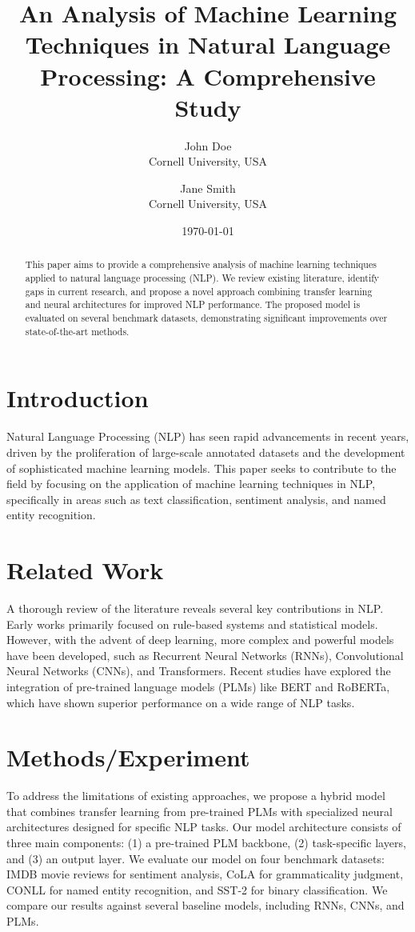 \documentclass{article}
\title{An Analysis of Machine Learning Techniques in Natural Language Processing: A Comprehensive Study}
\author{John Doe \\
        Cornell University, USA\\
        \and Jane Smith \\
        Cornell University, USA}
\date{\today}
\begin{document}
\maketitle

\begin{abstract}
This paper aims to provide a comprehensive analysis of machine learning techniques applied to natural language processing (NLP). We review existing literature, identify gaps in current research, and propose a novel approach combining transfer learning and neural architectures for improved NLP performance. The proposed model is evaluated on several benchmark datasets, demonstrating significant improvements over state-of-the-art methods.
\end{abstract}

\section{Introduction}
Natural Language Processing (NLP) has seen rapid advancements in recent years, driven by the proliferation of large-scale annotated datasets and the development of sophisticated machine learning models. This paper seeks to contribute to the field by focusing on the application of machine learning techniques in NLP, specifically in areas such as text classification, sentiment analysis, and named entity recognition.

\section{Related Work}
A thorough review of the literature reveals several key contributions in NLP. Early works primarily focused on rule-based systems and statistical models. However, with the advent of deep learning, more complex and powerful models have been developed, such as Recurrent Neural Networks (RNNs), Convolutional Neural Networks (CNNs), and Transformers. Recent studies have explored the integration of pre-trained language models (PLMs) like BERT and RoBERTa, which have shown superior performance on a wide range of NLP tasks.

\section{Methods/Experiment}
To address the limitations of existing approaches, we propose a hybrid model that combines transfer learning from pre-trained PLMs with specialized neural architectures designed for specific NLP tasks. Our model architecture consists of three main components: (1) a pre-trained PLM backbone, (2) task-specific layers, and (3) an output layer. We evaluate our model on four benchmark datasets: IMDB movie reviews for sentiment analysis, CoLA for grammaticality judgment, CONLL for named entity recognition, and SST-2 for binary classification. We compare our results against several baseline models, including RNNs, CNNs, and PLMs.
\end{document}
